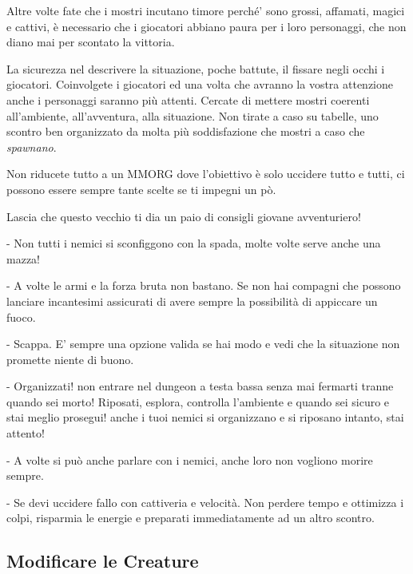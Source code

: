 \begin{multicols}{2}
Altre volte fate che i mostri incutano timore perché' sono grossi, affamati, magici e cattivi, è necessario che i giocatori abbiano paura per i loro personaggi, che non diano mai per scontato la vittoria.

La sicurezza nel descrivere la situazione, poche battute, il fissare negli occhi i giocatori. Coinvolgete i giocatori ed una volta che avranno la vostra attenzione anche i personaggi saranno più attenti. Cercate di mettere mostri coerenti all'ambiente, all'avventura, alla situazione. Non tirate a caso su tabelle, uno scontro ben organizzato da molta più soddisfazione che mostri a caso che \textit{spawnano}.

Non riducete tutto a un MMORG dove l'obiettivo è solo uccidere tutto e tutti, ci possono essere sempre tante scelte se ti impegni un pò.

\begin{changemargin}{0.3cm}{0.3cm}\begin{tcolorbox}[title = Affrontare i mostri]
{
Lascia che questo vecchio ti dia un paio di consigli giovane avventuriero!

- Non tutti i nemici si sconfiggono con la spada, molte volte serve anche una mazza!

- A volte le armi e la forza bruta non bastano. Se non hai compagni che possono lanciare incantesimi assicurati di avere sempre la possibilità di appiccare un fuoco.

- Scappa. E' sempre una opzione valida se hai modo e vedi che la situazione non promette niente di buono.

- Organizzati! non entrare nel dungeon a testa bassa senza mai fermarti tranne quando sei morto! Riposati, esplora, controlla l'ambiente e quando sei sicuro e stai meglio prosegui! anche i tuoi nemici si organizzano e si riposano intanto, stai attento!

- A volte si può anche parlare con i nemici, anche loro non vogliono morire sempre.

- Se devi uccidere fallo con cattiveria e velocità. Non perdere tempo e ottimizza i colpi, risparmia le energie e preparati immediatamente ad un altro scontro.

}\end{tcolorbox}\end{changemargin}

\subsection{Modificare le Creature}


\end{multicols}
